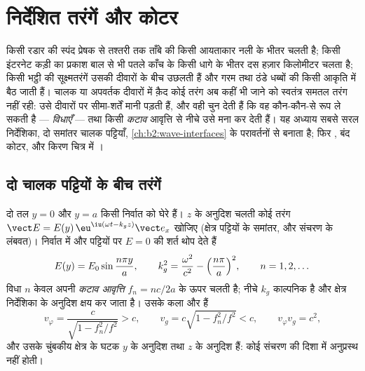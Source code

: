 \chapter{निर्देशित तरंगें और कोटर}\label{ch:b2:guided-waves}

किसी रडार की स्पंद प्रेषक से तश्तरी तक ताँबे की किसी आयताकार नली के भीतर
चलती है; किसी इंटरनेट कड़ी का प्रकाश बाल से भी पतले काँच के किसी धागे के
भीतर दस हज़ार किलोमीटर चलता है; किसी भट्ठी की सूक्ष्मतरंगें उसकी दीवारों
के बीच उछलती हैं और गरम तथा ठंडे धब्बों की किसी आकृति में बैठ जाती हैं।
चालक या अपवर्तक दीवारों में क़ैद कोई तरंग अब कहीं भी जाने को स्वतंत्र समतल
तरंग नहीं रही: उसे दीवारों पर सीमा-शर्तें मानी पड़ती हैं, और वही चुन देती
हैं कि वह कौन-कौन-से रूप ले सकती है --- \emph{विधाएँ} --- तथा किसी
\emph{कटाव} आवृत्ति से नीचे उसे मना कर देती हैं। यह अध्याय सबसे सरल
निर्देशिका, दो समांतर चालक पट्टियाँ, \cref{ch:b2:wave-interfaces} के
परावर्तनों से बनाता है; फिर , बंद कोटर, और किरण
चित्र में ।

\section{दो चालक पट्टियों के बीच तरंगें}

\begin{proposition}[समांतर-पट्टी निर्देशिका की विधाएँ]\label{prop:b2:guided-waves:plates}
दो  तल $y = 0$ और $y = a$ किसी निर्वात को घेरे हैं।
$z$ के अनुदिश चलती कोई तरंग $\vect E = E(y)\,\eu^{\iu(\omega t - k_gz)}
\vect e_x$ खोजिए (क्षेत्र पट्टियों के समांतर, और संचरण के
लंबवत)। निर्वात में  और पट्टियों पर $E = 0$ की शर्त
थोप देते हैं
\[
E(y) = E_0\sin\frac{n\pi y}a , \qquad
k_g^2 = \frac{\omega^2}{c^2} - \Bigl(\frac{n\pi}a\Bigr)^2 , \qquad n = 1, 2, \dots
\]
विधा $n$ केवल अपनी \emph{कटाव आवृत्ति} $f_n = nc/2a$ के ऊपर चलती है;
नीचे $k_g$ काल्पनिक है और क्षेत्र निर्देशिका के अनुदिश क्षय कर जाता है। उसके
कला और  हैं
\[
v_\varphi = \frac c{\sqrt{1 - f_n^2/f^2}} > c , \qquad
v_g = c\sqrt{1 - f_n^2/f^2} < c , \qquad v_\varphi v_g = c^2 ,
\]
और उसके चुंबकीय क्षेत्र के घटक $y$ के अनुदिश तथा $z$ के अनुदिश हैं: कोई
 संचरण की दिशा में अनुप्रस्थ नहीं होती।
\end{proposition}

